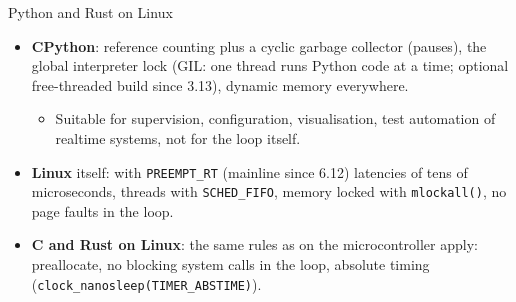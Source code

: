 \begin{frame}{Python and Rust on Linux}
  \begin{itemize}
    \item \textbf{CPython}: reference counting plus a cyclic garbage collector (pauses), the global interpreter lock (GIL: one thread runs Python code at a time; optional free-threaded build since 3.13), dynamic memory everywhere.
    \begin{itemize}
      \item Suitable for supervision, configuration, visualisation, test automation of realtime systems, not for the loop itself.
    \end{itemize}
    \item \textbf{Linux} itself: with \texttt{PREEMPT\_RT} (mainline since 6.12) latencies of tens of microseconds, threads with \texttt{SCHED\_FIFO}, memory locked with \texttt{mlockall()}, no page faults in the loop.
    \item \textbf{C and Rust on Linux}: the same rules as on the microcontroller apply: preallocate, no blocking system calls in the loop, absolute timing (\texttt{clock\_nanosleep(TIMER\_ABSTIME)}).
  \end{itemize}
\end{frame}



